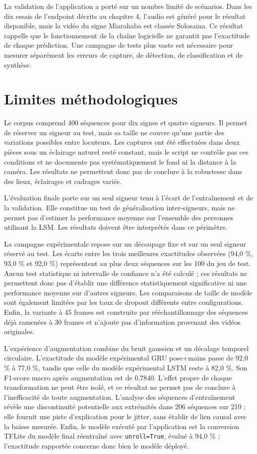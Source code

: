 La validation de l'application a porté sur un nombre limité de scénarios. Dans les dix essais de l'endpoint décrits au chapitre 4, l'audio est généré pour le résultat disponible, mais la vidéo du signe Miarahaba est classée Solosaina. Ce résultat rappelle que le fonctionnement de la chaîne logicielle ne garantit pas l'exactitude de chaque prédiction. Une campagne de tests plus vaste est nécessaire pour mesurer séparément les erreurs de capture, de détection, de classification et de synthèse.

\section{Limites méthodologiques}

Le corpus comprend 400 séquences pour dix signes et quatre signeurs. Il permet de réserver un signeur au test, mais sa taille ne couvre qu'une partie des variations possibles entre locuteurs. Les captures ont été effectuées dans deux pièces sous un éclairage naturel resté constant, mais le script ne contrôle pas ces conditions et ne documente pas systématiquement le fond ni la distance à la caméra. Les résultats ne permettent donc pas de conclure à la robustesse dans des lieux, éclairages et cadrages variés.

L'évaluation finale porte sur un seul signeur tenu à l'écart de l'entraînement et de la validation. Elle constitue un test de généralisation inter-signeurs, mais ne permet pas d'estimer la performance moyenne sur l'ensemble des personnes utilisant la LSM. Les résultats doivent être interprétés dans ce périmètre.

La campagne expérimentale repose sur un découpage fixe et sur un seul signeur réservé au test. Les écarts entre les trois meilleures exactitudes observées (94,0 \%, 93,0 \% et 92,0 \%) représentent au plus deux séquences sur les 100 du jeu de test. Aucun test statistique ni intervalle de confiance n'a été calculé ; ces résultats ne permettent donc pas d'établir une différence statistiquement significative ni une performance moyenne sur d'autres signeurs. Les comparaisons de taille de modèle sont également limitées par les taux de dropout différents entre configurations. Enfin, la variante à 45 frames est construite par rééchantillonnage des séquences déjà ramenées à 30 frames et n'ajoute pas d'information provenant des vidéos originales.

L'expérience d'augmentation combine du bruit gaussien et un décalage temporel circulaire. L'exactitude du modèle expérimental GRU pose+mains passe de 92,0 \% à 77,0 \%, tandis que celle du modèle expérimental LSTM reste à 82,0 \%. Son F1-score macro après augmentation est de 0,7840. L'effet propre de chaque transformation ne peut être isolé, et ce résultat ne permet pas de conclure à l'inefficacité de toute augmentation. L'analyse des séquences d'entraînement révèle une discontinuité potentielle aux extrémités dans 206 séquences sur 210 ; elle fournit une piste d'explication pour le jitter, sans établir de lien causal avec la baisse mesurée. Enfin, le modèle exécuté par l'application est la conversion TFLite du modèle final réentraîné avec \texttt{unroll=True}, évalué à 94,0 \% ; l'exactitude rapportée concerne donc bien le modèle déployé.

